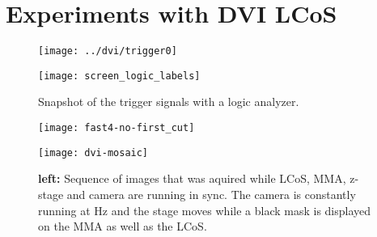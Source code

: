 \chapter{Experiments with DVI LCoS}

\begin{figure}[!hbt]
  \centering
  \texttt{[image: ../dvi/trigger0]}
  \caption{}
  \label{fig:trigger0}
\end{figure}


\begin{figure}[!hbt]
  \centering
  \texttt{[image: screen\_logic\_labels]}
  \caption{Snapshot of the trigger signals with a logic analyzer.}
  \label{fig:screen_logic_labels}
\end{figure}

\begin{figure}[!hbt]
  \centering
  \texttt{[image: fast4-no-first\_cut]}
  \caption{}
  \label{fig:fast4-no-first_cut}
\end{figure}


\begin{figure}[!hbt]
  \centering
  \texttt{[image: dvi-mosaic]}
  \caption{{\bf left:} Sequence of images that was aquired while LCoS,
    MMA, z-stage and camera are running in sync. The camera is
    constantly running at \unit[30]{Hz} and the stage moves while a
    black mask is displayed on the MMA as well as the LCoS.}
  \label{fig:dvi-mosaic}
\end{figure}

